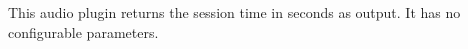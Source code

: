 This audio plugin returns the session time in seconds as output. It
has no configurable parameters.
